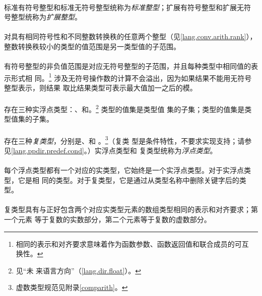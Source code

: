 {\paragraph{}
标准有符号整型和标准无符号整型统称为\textit{标准整型}；扩展有符号整型和扩展无符
号整型统称为\textit{扩展整型}。

\paragraph{}
对具有相同符号性和不同整数转换秩的任意两个整型（见\ref{lang.conv.arith.rank}），
整数转换秩较小的类型的值范围是另一类型值的子范围。

\paragraph{}
有符号整型的非负值范围是对应无符号整型的子范围，并且每种类型中相同值的表示形式相
同。\footnote{相同的表示和对齐要求意味着作为函数参数、函数返回值和联合成员的可互
换性。} 涉及无符号操作数的计算不会溢出，因为如果结果不能用无符号整型表示，则结果
取比结果类型可表示最大值加一之后的模。

\paragraph{}
存在三种实浮点类型：、和。\footnote{见``未
来语言方向''（\ref{lang.dir.float}）。 } 类型的值集是类型值
集的子集；类型的值集是类型值集的子集。

\paragraph{}
存在三种\textit{复类型}，分别是、和
。\footnote{虚数类型规范见附录\ref{comparith}。}（复类
型是条件特性，不要求实现支持；请参见\ref{lang.ppdir.predef.cond}。）实浮点类型和
复类型统称为\textit{浮点类型}。

\paragraph{}
每个浮点类型都有一个对应的实类型，它始终是一个实浮点类型。对于实浮点类型，它是相
同的类型。对于复类型，它是通过从类型名称中删除关键字后的类型。

\paragraph{}
复类型具有与正好包含两个对应实类型元素的数组类型相同的表示和对齐要求；第一个元素
等于复数的实数部分，第二个元素等于复数的虚数部分。

}
